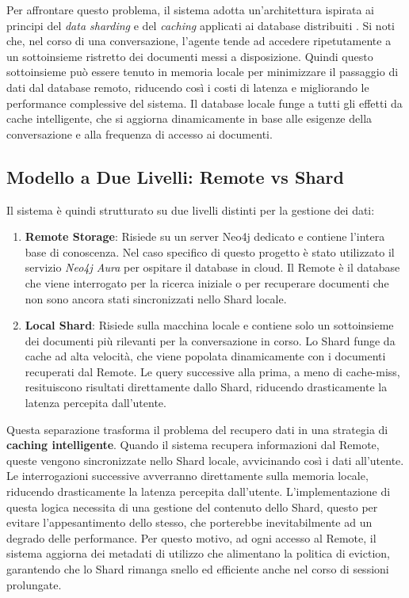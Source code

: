 Per affrontare questo problema, il sistema adotta un'architettura ispirata ai principi del \textit{data sharding} e del \textit{caching} applicati ai database distribuiti \cite{kleppmann2017}. Si noti che, nel corso di una conversazione, l'agente tende ad accedere ripetutamente a un sottoinsieme ristretto dei documenti messi a disposizione. Quindi questo sottoinsieme può essere tenuto in memoria locale per minimizzare il passaggio di dati dal database remoto, riducendo così i costi di latenza e migliorando le performance complessive del sistema. Il database locale funge a tutti gli effetti da cache intelligente, che si aggiorna dinamicamente in base alle esigenze della conversazione e alla frequenza di accesso ai documenti.

\newpage

\subsection{Modello a Due Livelli: Remote vs Shard}

Il sistema è quindi strutturato su due livelli distinti per la gestione dei dati:

\begin{enumerate}
    \item \textbf{Remote Storage}: Risiede su un server Neo4j dedicato e contiene l'intera base di conoscenza. Nel caso specifico di questo progetto è stato utilizzato il servizio \textit{Neo4j Aura} per ospitare il database in cloud. Il Remote è il database che viene interrogato per la ricerca iniziale o per recuperare documenti che non sono ancora stati sincronizzati nello Shard locale.

    \item \textbf{Local Shard}: Risiede sulla macchina locale e contiene solo un sottoinsieme dei documenti più rilevanti per la conversazione in corso. Lo Shard funge da cache ad alta velocità, che viene popolata dinamicamente con i documenti recuperati dal Remote. Le query successive alla prima, a meno di cache-miss, resituiscono risultati direttamente dallo Shard, riducendo drasticamente la latenza percepita dall'utente.
\end{enumerate}

Questa separazione trasforma il problema del recupero dati in una strategia di \textbf{caching intelligente}. Quando il sistema recupera informazioni dal Remote, queste vengono sincronizzate nello Shard locale, avvicinando così i dati all'utente. Le interrogazioni successive avverranno direttamente sulla memoria locale, riducendo drasticamente la latenza percepita dall'utente. L'implementazione di questa logica necessita di una gestione del contenuto dello Shard, questo per evitare l'appesantimento dello stesso, che porterebbe inevitabilmente ad un degrado delle performance. Per questo motivo, ad ogni accesso al Remote, il sistema aggiorna dei metadati di utilizzo che alimentano la politica di eviction, garantendo che lo Shard rimanga snello ed efficiente anche nel corso di sessioni prolungate.

